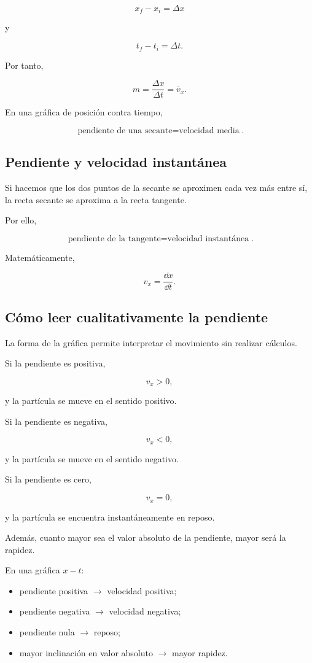 \[
x_f-x_i=\Delta x
\]

y

\[
t_f-t_i=\Delta t.
\]

Por tanto,

\[ \boxed{m=\frac{\Delta x}{\Delta t}=\bar{v}_x}. \]

\begin{idea}
En una gráfica de posición contra tiempo,

\[
\boxed{
\text{pendiente de una secante}
=
\text{velocidad media}
}.
\]
\end{idea}


\subsection{Pendiente y velocidad instantánea}

Si hacemos que los dos puntos de la secante se aproximen cada vez más entre
sí, la recta secante se aproxima a la recta tangente.

Por ello,

\[
\boxed{
\text{pendiente de la tangente}
=
\text{velocidad instantánea}
}.
\]

Matemáticamente,

\[ v_x=\frac{\dd x}{\dd t}. \]


\subsection{Cómo leer cualitativamente la pendiente}

La forma de la gráfica permite interpretar el movimiento sin realizar
cálculos.

Si la pendiente es positiva,

\[ v_x>0, \]

y la partícula se mueve en el sentido positivo.

Si la pendiente es negativa,

\[ v_x<0, \]

y la partícula se mueve en el sentido negativo.

Si la pendiente es cero,

\[ v_x=0, \]

y la partícula se encuentra instantáneamente en reposo.

Además, cuanto mayor sea el valor absoluto de la pendiente, mayor será la
rapidez.

\begin{idea}
En una gráfica \(x-t\):

\begin{itemize}
    \item pendiente positiva \(\rightarrow\) velocidad positiva;
    \item pendiente negativa \(\rightarrow\) velocidad negativa;
    \item pendiente nula \(\rightarrow\) reposo;
    \item mayor inclinación en valor absoluto \(\rightarrow\) mayor rapidez.
\end{itemize}
\end{idea}


